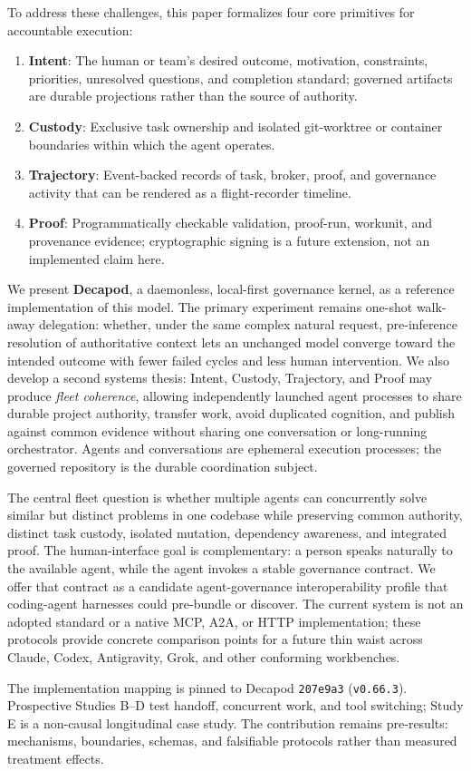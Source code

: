 To address these challenges, this paper formalizes four core primitives for accountable execution:
\begin{enumerate}
    \item \textbf{Intent}: The human or team's desired outcome, motivation, constraints, priorities, unresolved questions, and completion standard; governed artifacts are durable projections rather than the source of authority.
    \item \textbf{Custody}: Exclusive task ownership and isolated git-worktree or container boundaries within which the agent operates.
    \item \textbf{Trajectory}: Event-backed records of task, broker, proof, and governance activity that can be rendered as a flight-recorder timeline.
    \item \textbf{Proof}: Programmatically checkable validation, proof-run, workunit, and provenance evidence; cryptographic signing is a future extension, not an implemented claim here.
\end{enumerate}

We present \textbf{Decapod}, a daemonless, local-first governance kernel, as a reference implementation of this model. The primary experiment remains one-shot walk-away delegation: whether, under the same complex natural request, pre-inference resolution of authoritative context lets an unchanged model converge toward the intended outcome with fewer failed cycles and less human intervention. We also develop a second systems thesis: Intent, Custody, Trajectory, and Proof may produce \emph{fleet coherence}, allowing independently launched agent processes to share durable project authority, transfer work, avoid duplicated cognition, and publish against common evidence without sharing one conversation or long-running orchestrator. Agents and conversations are ephemeral execution processes; the governed repository is the durable coordination subject.

The central fleet question is whether multiple agents can concurrently solve similar but distinct problems in one codebase while preserving common authority, distinct task custody, isolated mutation, dependency awareness, and integrated proof. The human-interface goal is complementary: a person speaks naturally to the available agent, while the agent invokes a stable governance contract. We offer that contract as a candidate agent-governance interoperability profile that coding-agent harnesses could pre-bundle or discover. The current system is not an adopted standard or a native MCP, A2A, or HTTP implementation; these protocols provide concrete comparison points for a future thin waist across Claude, Codex, Antigravity, Grok, and other conforming workbenches.

The implementation mapping is pinned to Decapod \texttt{207e9a3} (\texttt{v0.66.3}). Prospective Studies B--D test handoff, concurrent work, and tool switching; Study E is a non-causal longitudinal case study. The contribution remains pre-results: mechanisms, boundaries, schemas, and falsifiable protocols rather than measured treatment effects.
